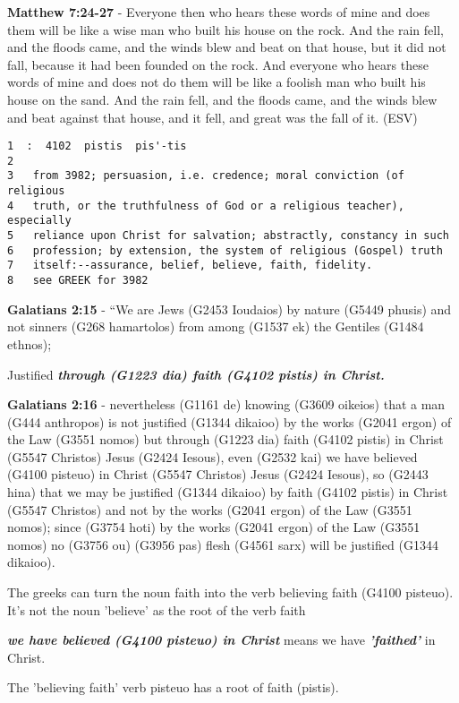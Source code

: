 \documentclass[11pt]{article}
\begin{document}
\textbf{Matthew 7:24-27} - Everyone then who hears these words of mine and does them will be like a wise man who built his house on the rock. And the rain fell, and the floods came, and the winds blew and beat on that house, but it did not fall, because it had been founded on the rock. And everyone who hears these words of mine and does not do them will be like a foolish man who built his house on the sand. And the rain fell, and the floods came, and the winds blew and beat against that house, and it fell, and great was the fall of it. (ESV)

\begin{verbatim}
1  :  4102  pistis  pis'-tis  
2  
3   from 3982; persuasion, i.e. credence; moral conviction (of religious
4   truth, or the truthfulness of God or a religious teacher), especially
5   reliance upon Christ for salvation; abstractly, constancy in such
6   profession; by extension, the system of religious (Gospel) truth
7   itself:--assurance, belief, believe, faith, fidelity.
8   see GREEK for 3982
\end{verbatim}

\textbf{Galatians 2:15} - “We are Jews (G2453 Ioudaios) by nature (G5449 phusis) and not sinners (G268 hamartolos) from among (G1537 ek) the Gentiles (G1484 ethnos);

Justified \emph{\textbf{through (G1223 dia) faith (G4102 pistis) in Christ.}}

\textbf{Galatians 2:16} - nevertheless (G1161 de) knowing (G3609 oikeios) that a man (G444 anthropos) is not justified (G1344 dikaioo) by the works (G2041 ergon) of the Law (G3551 nomos) but through (G1223 dia) faith (G4102 pistis) in Christ (G5547 Christos) Jesus (G2424 Iesous), even (G2532 kai) we have believed (G4100 pisteuo) in Christ (G5547 Christos) Jesus (G2424 Iesous), so (G2443 hina) that we may be justified (G1344 dikaioo) by faith (G4102 pistis) in Christ (G5547 Christos) and not by the works (G2041 ergon) of the Law (G3551 nomos); since (G3754 hoti) by the works (G2041 ergon) of the Law (G3551 nomos) no (G3756 ou) (G3956 pas) flesh (G4561 sarx) will be justified (G1344 dikaioo).

The greeks can turn the noun faith into the verb believing faith (G4100 pisteuo).
It's not the noun 'believe' as the root of the verb faith

\emph{\textbf{we have believed (G4100 pisteuo) in Christ}} means we have \emph{\textbf{'faithed'}} in Christ.

The 'believing faith' verb pisteuo has a root of faith (pistis).
\end{document}
